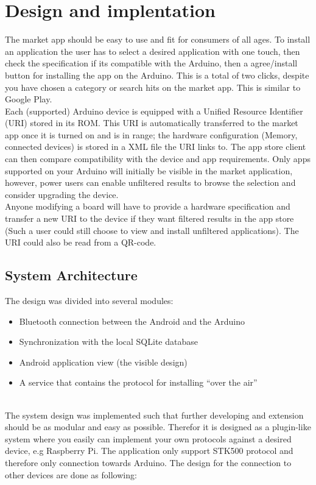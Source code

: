 \section{Design and implentation}
The market app should be easy to use and fit for consumers of all ages. To install an application the user has to select a desired application with one touch, then check the specification if its compatible with the Arduino, then a agree/install button for installing the app on the Arduino. This is a total of two clicks, despite you have chosen a category or search hits on the market app. This is similar to Google Play.\\
\newline
Each (supported) Arduino device is equipped with a Unified Resource Identifier (URI) stored in its ROM. This URI is automatically transferred to the market app once it is turned on and is in range; the hardware configuration (Memory, connected devices) is stored in a XML file the URI links to.
The app store client can then compare compatibility with the device and app requirements.
Only apps supported on your Arduino will initially be visible in the market application, however, power users can enable unfiltered results to browse the selection and consider upgrading the device.\\
\newline
Anyone modifying a board will have to provide a hardware specification and transfer a new URI to the device if they want filtered results in the app store (Such a user could still choose to view and install unfiltered applications).
The URI could also be read from a QR-code.

\subsection{System Architecture}
	The design was divided into several modules:
	\begin{itemize}
		\item{Bluetooth connection between the Android and the Arduino}
		\item{Synchronization with the local SQLite database}
		\item{Android application view (the visible design)}
		\item{A service that contains the protocol for installing ``over the air''}
	\end{itemize}
	\newLine
	\\
	The system design was implemented such that further developing and extension should be as modular and easy as possible.
	Therefor it is designed as a plugin-like system where you easily can implement your own protocols against a desired device, e.g Raspberry Pi. The application only support STK500 protocol and therefore only connection towards Arduino.
	The design for the connection to other devices are done as following:\\

